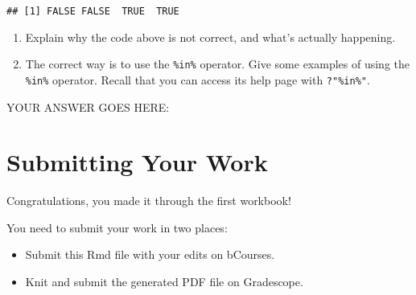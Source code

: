 \documentclass[
]{article}
\providecommand{\tightlist}{%
  \setlength{\itemsep}{0pt}\setlength{\parskip}{0pt}}
\begin{document}
\begin{verbatim}
## [1] FALSE FALSE  TRUE  TRUE
\end{verbatim}

\begin{enumerate}
\def\labelenumi{\arabic{enumi}.}
\item
  Explain why the code above is not correct, and what's actually
  happening.
\item
  The correct way is to use the \texttt{\%in\%} operator. Give some
  examples of using the \texttt{\%in\%} operator. Recall that you can
  access its help page with \texttt{?"\%in\%"}.
\end{enumerate}

YOUR ANSWER GOES HERE:

\hypertarget{submitting-your-work}{%
\section{Submitting Your Work}\label{submitting-your-work}}

Congratulations, you made it through the first workbook!

You need to submit your work in two places:

\begin{itemize}
\tightlist
\item
  Submit this Rmd file with your edits on bCourses.
\item
  Knit and submit the generated PDF file on Gradescope.
\end{itemize}
\end{document}
